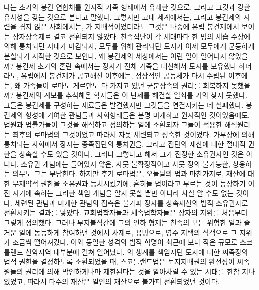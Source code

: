나는 초기의 봉건 연합체를 원시적 가족 형태에서 유래한 것으로,
그리고
그것과 강한 유사성을 갖는 것으로 본다고 말했다.
그렇지만 고대 세계에서는,
그리고 봉건제의 시련을 겪지 않은 사회에서는,
가 지배적이었더라도 그것은 나중에 유럽 봉건제에서 보이는
장자상속제로 결코 전환되지 않았다.
친족집단이 각 세대마다 한 명의 세습 수장에 의해 통치되던 시대가 마감되자,
모두를 위해 관리되던 토지가 이제 모두에게 균등하게 분할되기
시작한 것으로 보인다.
왜 봉건제의 세상에서는 이런 일이 일어나지 않았을까?
봉건제 초기의 혼란 속에서는 장자가
전체 가족을 대신해서 토지를 보유했다 하더라도,
유럽에서 봉건제가 공고해진 이후에는,
정상적인 공동체가 다시 수립된 이후에는,
왜 가족들이
로마도 게르만도 다 가지고 있던 균분상속의 권리를
회복하지 못했을까?
봉건제의 계보를 추척해온 학자들은
이 난제를 해결할 열쇠를 거의 찾지 못했다.
그들은 봉건제를 구성하는 재료들은 발견했지만
그것들을 연결시키는 데 실패했다.
봉건제의 형성에 기여한 관념들과 사회형태들은
분명 미개하고 원시적인 것이었음에도,
법원과 법률가들이 그것을 해석하고 정의하는 일에 소환되자
그들이 적용한 해석원리는 최후의 로마법의 그것이었고
따라서 자못 세련되고 성숙한 것이었다.
가부장에 의해 통치되는 사회에서
장자는 종족집단의 통치권을,
그리고 집단의 재산에 대한 절대적 권한을 상속할 수도 있을 것이다.
그러나 그렇다고 해서 그가 진정한 소유권자인 것은 아니다.
소유권 개념에는 들어있지 않은,
사뭇 불확정적이고 사뭇 정의 불가능한,
상응하는 의무도 그는 부담한다.
하지만 후기 로마법은, 오늘날의 법과 마찬가지로,
재산에 대한 무제약적 권한을 소유권과 등치시켰기에,
흔히들 법이라고 부르는 것이 등장하기 이전 시기에 속하는
그러한 책임 개념을 알지 못할 뿐만 아니라 사실 알 수도 없는 것이다.
세련된 관념과 미개한 관념의 접촉은 불가피
장자를 상속재산의 법적 소유권자로 전환시키는 결과를 낳았다.
교회법학자들과 세속법학자들은 장자의 지위를 처음부터 그렇게 정의했다.
그러나 부지불식간에 그의 연하 형제는
친족의 모든 위험한 일과 즐거운 일에 동등하게 참여하던 것에서
사제로, 용병으로, 영주 저택의 식객으로 그 지위가 조금씩 떨어져갔다.
이와 동일한 성격의 법적 혁명이
최근에
보다 작은 규모로
스코틀랜드 산악지역 대부분에 걸쳐 일어났다.
의 생계를 책임지던 토지에 대한 씨족장의 법적 권한을
결정하도록 소환되었을 때, 스코틀랜드법은
토지지배권의 완전성이
씨족원들의 권리에 의해 막연하게나마 제한된다는 것을
알아차릴 수 있는 시대를 한참 지나있었고,
따라서 다수의 재산은 일인의 재산으로 불가피 전환되었던 것이다.

